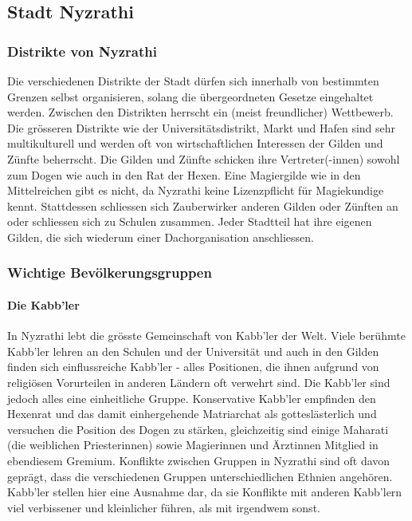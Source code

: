 \documentclass[12pt,twoside,twocolumn,openany]{book}
\begin{document}
\subsection{Stadt Nyzrathi}
\subsubsection{Distrikte von Nyzrathi} Die verschiedenen Distrikte der Stadt dürfen sich innerhalb von bestimmten Grenzen selbst organisieren, solang die übergeordneten Gesetze eingehaltet werden. Zwischen den Distrikten herrscht ein (meist freundlicher) Wettbewerb. Die grösseren Distrikte wie der Universitätsdistrikt, Markt und Hafen sind sehr multikulturell und werden oft von wirtschaftlichen Interessen der Gilden und Zünfte beherrscht. Die Gilden und Zünfte schicken ihre Vertreter(-innen) sowohl zum Dogen wie auch in den Rat der Hexen. Eine Magiergilde wie in den Mittelreichen gibt es nicht, da Nyzrathi keine Lizenzpflicht für Magiekundige kennt. Stattdessen schliessen sich Zauberwirker anderen Gilden oder Zünften an oder schliessen sich zu Schulen zusammen. Jeder Stadtteil hat ihre eigenen Gilden, die sich wiederum einer Dachorganisation anschliessen.

\subsubsection{Wichtige Bevölkerungsgruppen}
\paragraph{Die Kabb'ler} In Nyzrathi lebt die grösste Gemeinschaft von Kabb'ler der Welt. Viele berühmte Kabb'ler lehren an den Schulen und der Universität und auch in den Gilden finden sich einflussreiche Kabb'ler - alles Positionen, die ihnen aufgrund von religiösen Vorurteilen in anderen Ländern oft verwehrt sind. Die Kabb'ler sind jedoch alles eine einheitliche Gruppe. Konservative Kabb'ler empfinden den Hexenrat und das damit einhergehende Matriarchat als gotteslästerlich und versuchen die Position des Dogen zu stärken, gleichzeitig sind einige Maharati (die weiblichen Priesterinnen) sowie Magierinnen und Ärztinnen  Mitglied in ebendiesem Gremium. Konflikte zwischen Gruppen in Nyzrathi sind oft davon geprägt, dass die verschiedenen Gruppen unterschiedlichen Ethnien angehören. Kabb'ler stellen hier eine Ausnahme dar, da sie Konflikte mit anderen Kabb'lern viel verbissener und kleinlicher führen, als mit irgendwem sonst.
\end{document}
